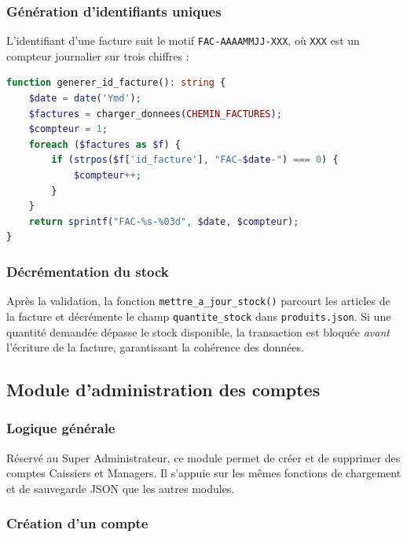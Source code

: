 \documentclass[12pt,a4paper]{article}
\begin{document}
\subsubsection{Génération d'identifiants uniques}

L'identifiant d'une facture suit le motif \texttt{FAC-AAAAMMJJ-XXX}, où \texttt{XXX} est un compteur journalier sur trois chiffres :

\begin{lstlisting}[language=PHP, caption={Génération d'un identifiant de facture}]
function generer_id_facture(): string {
    $date = date('Ymd');
    $factures = charger_donnees(CHEMIN_FACTURES);
    $compteur = 1;
    foreach ($factures as $f) {
        if (strpos($f['id_facture'], "FAC-$date-") === 0) {
            $compteur++;
        }
    }
    return sprintf("FAC-%s-%03d", $date, $compteur);
}
\end{lstlisting}

\subsubsection{Décrémentation du stock}

Après la validation, la fonction \texttt{mettre\_a\_jour\_stock()} parcourt les articles de la facture et décrémente le champ \texttt{quantite\_stock} dans \texttt{produits.json}. Si une quantité demandée dépasse le stock disponible, la transaction est bloquée \textit{avant} l'écriture de la facture, garantissant la cohérence des données.

\subsection{Module d'administration des comptes}

\subsubsection{Logique générale}

Réservé au Super Administrateur, ce module permet de créer et de supprimer des comptes Caissiers et Managers. Il s'appuie sur les mêmes fonctions de chargement et de sauvegarde JSON que les autres modules.

\subsubsection{Création d'un compte}
\end{document}
